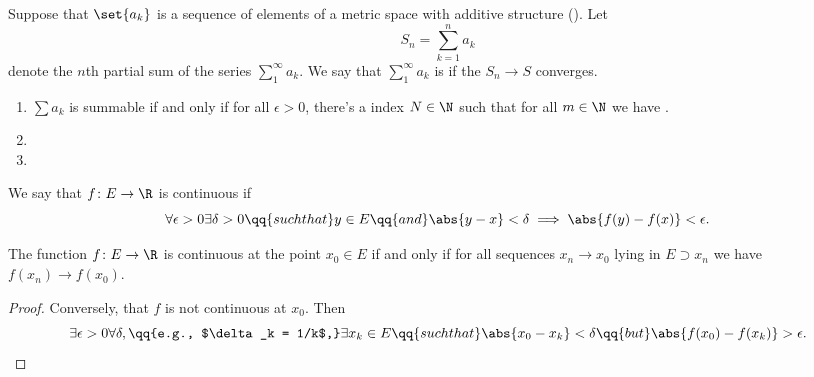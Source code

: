 \begin{defn}
    \label{defn:partial_sums}
    Suppose that $\set{a_k}$ is a sequence of elements of a metric space with additive structure (\TODO). Let 
    \begin{equation*}
        S_n = \sum\limits_{k=1}^{n}a_k
    \end{equation*}
    denote the $n$th partial sum of the series $\sum\limits_{1}^{\infty}a_k$. We say that 
$\sum\limits_{1}^{\infty}a_k$ is  if the $S_n \to S$ converges. 
\end{defn}

\begin{thm}
    \label{thm:summable_series}
    \begin{enumerate}
        \item $\sum a_k$ is summable if and only if for all $\epsilon > 0$, there's a index $N \in \N$ such that for all $m \in \N$ we have \TODO.
            \item \TODO
                \item \TODO
    \end{enumerate}
\end{thm}

\begin{defn}
    \label{defn:continuous_functions}
    We say that $f \colon E \to \R$ is continuous if 
    \begin{equation*}
        \forall \epsilon > 0 \exists \delta > 0 \qq{such that} y \in E \qq{and} \abs{y - x} < \delta \implies \abs{f(y) - f(x)} < \epsilon.
    \end{equation*}
\end{defn}

\begin{thm}
    \label{thm:sequentially_continuous_characterization}
    The function $f \colon E \to \R$ is continuous at the point $x_0 \in E$ if and only if for all sequences $x_n \to x_0$ lying in $E \supset x_n$ we have $f(x_n) \to f(x_0)$.
\end{thm}
\begin{proof}
\TODO
Conversely, that $f$ is not continuous at $x_0$. Then 
\begin{equation*}
    \exists \epsilon > 0 \forall \delta, \qq{e.g., $\delta_k = 1/k$,} \exists x_k \in E \qq{such that} \abs{x_0 - x_k}< \delta \qq{but} \abs{f(x_0) - f(x_k)} > \epsilon.
\end{equation*}
\TODO
\end{proof}

